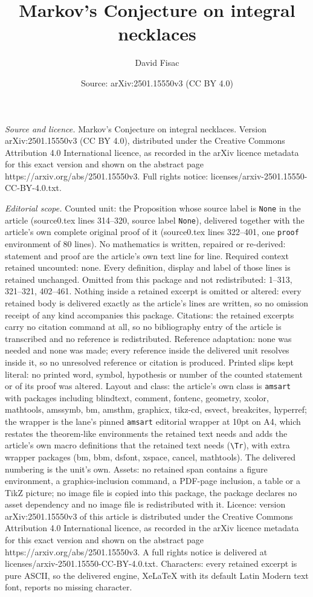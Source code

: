 \documentclass[10pt,a4paper]{amsart}
\title[Markov's Conjecture on integral necklaces]{Markov's Conjecture on integral necklaces}
\author{David Fisac}
\date{Source: arXiv:2501.15550v3 (CC BY 4.0)}
\begin{document}
\maketitle

\noindent\emph{Source and licence.} Markov's Conjecture on integral necklaces. Version arXiv:2501.15550v3 (CC BY 4.0), distributed under the Creative Commons Attribution 4.0 International licence, as recorded in the arXiv licence metadata for this exact version and shown on the abstract page https://arxiv.org/abs/2501.15550v3. Full rights notice: licenses/arxiv-2501.15550-CC-BY-4.0.txt.\par\smallskip

\noindent\textit{Editorial scope.} Counted unit: the Proposition whose source label is \texttt{None} in the article (source0.tex lines 314--320, source label \texttt{None}), delivered together with the article's own complete original proof of it (source0.tex lines 322--401, one \texttt{proof} environment of 80 lines). No mathematics is written, repaired or re-derived: statement and proof are the article's own text line for line. Required context retained uncounted: none. Every definition, display and label of those lines is retained unchanged. Omitted from this package and not redistributed: 1--313, 321--321, 402--461. Nothing inside a retained excerpt is omitted or altered: every retained body is delivered exactly as the article's lines are written, so no omission receipt of any kind accompanies this package. Citations: the retained excerpts carry no citation command at all, so no bibliography entry of the article is transcribed and no reference is redistributed. Reference adaptation: none was needed and none was made; every reference inside the delivered unit resolves inside it, so no unresolved reference or citation is produced. Printed slips kept literal: no printed word, symbol, hypothesis or number of the counted statement or of its proof was altered. Layout and class: the article's own class is \texttt{amsart} with packages including blindtext, comment, fontenc, geometry, xcolor, mathtools, amssymb, bm, amsthm, graphicx, tikz-cd, esvect, breakcites, hyperref; the wrapper is the lane's pinned \texttt{amsart} editorial wrapper at 10pt on A4, which restates the theorem-like environments the retained text needs and adds the article's own macro definitions that the retained text needs (\texttt{\textbackslash Tr}), with extra wrapper packages (bm, bbm, dsfont, xspace, cancel, mathtools). The delivered numbering is the unit's own. Assets: no retained span contains a figure environment, a graphics-inclusion command, a PDF-page inclusion, a table or a TikZ picture; no image file is copied into this package, the package declares no asset dependency and no image file is redistributed with it. Licence: version arXiv:2501.15550v3 of this article is distributed under the Creative Commons Attribution 4.0 International licence, as recorded in the arXiv licence metadata for this exact version and shown on the abstract page https://arxiv.org/abs/2501.15550v3. A full rights notice is delivered at licenses/arxiv-2501.15550-CC-BY-4.0.txt. Characters: every retained excerpt is pure ASCII, so the delivered engine, XeLaTeX with its default Latin Modern text font, reports no missing character.
\end{document}
